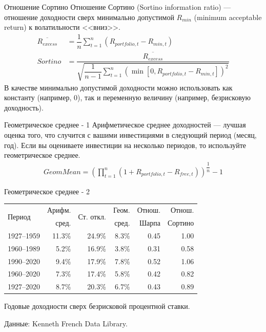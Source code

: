 \documentclass{beamer}
\begin{document}
\begin{frame}{Отношение Сортино}
\justify
Отношение Сортино (Sortino information ratio) --- отношение доходности сверх минимально допустимой $R_{min}$ (minimum acceptable return) к волатильности <<вниз>>.
\begin{align*}
\overline{R_{excess}} &= \dfrac{1}{n}\sum\limits_{t=1}^{n}(R_{portfolio,t} - R_{min,t}) \\
Sortino &= \dfrac{\overline{R_{excess}}}{\sqrt{\dfrac{1}{n-1}\sum\limits_{t=1}^{n}\left(\min[0, R_{portfolio,t} - R_{min, t}]\right)^2}}
\end{align*}
В качестве минимально допустимой доходности можно использовать как константу (например, 0), так и переменную величину (например, безрисковую доходность).
\end{frame}



\begin{frame}{Геометрическое среднее - 1}
\justify
Арифметическое среднее доходностей --- лучшая оценка того, что случится с вашими инвестициями в следующий период (месяц, год). Если вы оцениваете инвестиции на несколько периодов, то используйте геометрическое среднее.
\begin{align*}
Geom Mean = \left(\prod\limits_{t=1}^{n}(1 + R_{portfolio,t} - R_{free,t}) \right)^{\dfrac{1}{n}} - 1
\end{align*}
\end{frame}



\begin{frame}{Геометрическое среднее - 2}
\centering
\begin{tabular}{l|r|r|r|r|r}
\multirow{2}{*}{Период} &
Арифм. & 
\multirow{2}{*}{Ст. откл.} &
Геом. &
Отнош. &
Отнош. \\
& сред. & & сред. & Шарпа & Сортино \\ 
\hline
1927--1959 & 11.3\% & 24.9\% & 8.3\% & 0.45 & 1.00 \\
1960--1989 &  5.2\% & 16.9\% & 3.8\% & 0.31 & 0.58 \\
1990--2020 &  9.4\% & 17.9\% & 7.8\% & 0.52 & 1.06 \\
1960--2020 &  7.3\% & 17.4\% & 5.8\% & 0.42 & 0.82 \\ \hline
1927--2020 &  8.7\% & 20.3\% & 6.7\% & 0.43 & 0.89
\end{tabular}

{\scriptsize Годовые доходности сверх безрисковой процентной ставки.

Данные: Kenneth French Data Library. \par }
\end{frame}
\end{document}
